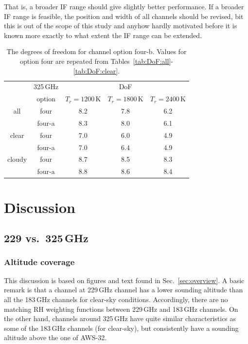 \documentclass[12pt]{article}
\begin{document}
That is, a broader IF range should give slightly better performance. If a
broader IF range is feasible, the position and width of all channels should be
revised, bit this is out of the scope of this study and anyhow hardly motivated
before it is known more exactly to what extent the IF range can be extended.


\begin{table}[!bt]
	\centering
	\begin{tabular}[b]{c|c|c|c|c}
      &	325\,GHz & \multicolumn{3}{c}{DoF}   \\
      &	option &  $T_r = 1200 $\,K &   $T_r = 1800 $\,K &   $T_r = 2400$\,K \\
      \hline
      all &	four   &              8.2 &              7.8 &              6.2 \\
      & four-a   &              8.3 &              8.0   &              6.1 \\

      \hline
      clear  &	four  &                7.0 &              6.0 &              4.9 \\
      &   four-a &                7.0 &              6.4 &              4.9 \\
	
      \hline	
      cloudy &	four  &              8.7 &              8.5 &              8.3 \\
      &   four-a &              8.8 &              8.6 &              8.4 \\
      \hline
\end{tabular}
\caption{The degrees of freedom for channel option four-b. Values for option
  four are repeated from Tables~\ref{tab:DoF:all}-\ref{tab:DoF:clear}. }
\label{tab:DoF:4b}
\end{table}
\section{Discussion}

\subsection{229 vs.\ 325\,GHz}
\subsubsection{Altitude coverage}
%
This discussion is based on figures and text found in Sec.~\ref{sec:overview}.
A basic remark is that a channel at 229\,GHz channel has a lower sounding
altitude than all the 183\,GHz channels for clear-sky conditions. Accordingly,
there are no matching RH weighting functions between 229\,GHz and 183\,GHz
channels. On the other hand, channels around 325\,GHz have quite similar
characteristics as some of the 183\,GHz channels (for clear-sky), but
consistently have a sounding altitude above the one of AWS-32.
\end{document}
